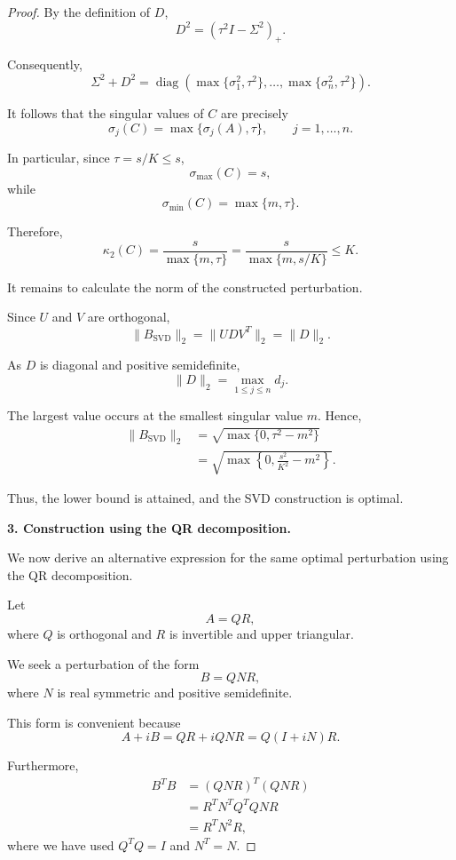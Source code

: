 \documentclass[11pt, reqno, a4paper]{amsart}
\theoremstyle{plain}
\theoremstyle{definition}
\theoremstyle{remark}
\numberwithin{equation}{section}
\begin{document}
\begin{proof}
By the definition of $D$,
\[
D^2=(\tau^2I-\Sigma^2)_+.
\]

Consequently,
\[
\Sigma^2+D^2
=
\operatorname{diag}
\left(
\max\{\sigma_1^2,\tau^2\},
\ldots,
\max\{\sigma_n^2,\tau^2\}
\right).
\]

It follows that the singular values of $C$ are precisely
\[
\boxed{
\sigma_j(C)=\max\{\sigma_j(A),\tau\},
\qquad j=1,\ldots,n.
}
\]

In particular, since $\tau=s/K\leq s$,
\[
\sigma_{\max}(C)=s,
\]
while
\[
\sigma_{\min}(C)=\max\{m,\tau\}.
\]

Therefore,
\[
\boxed{
\kappa_2(C)
=
\frac{s}{\max\{m,\tau\}}
=
\frac{s}{\max\{m,s/K\}}
\leq K.
}
\]

It remains to calculate the norm of the constructed
perturbation.

Since $U$ and $V$ are orthogonal,
\[
\|B_{\mathrm{SVD}}\|_2
=
\|UDV^T\|_2
=
\|D\|_2.
\]

As $D$ is diagonal and positive semidefinite,
\[
\|D\|_2
=
\max_{1\leq j\leq n}d_j.
\]

The largest value occurs at the smallest singular value
$m$. Hence,
\begin{align*}
\|B_{\mathrm{SVD}}\|_2
&=
\sqrt{\max\{0,\tau^2-m^2\}}\\
&=
\sqrt{
\max\left\{
0,\frac{s^2}{K^2}-m^2
\right\}
}.
\end{align*}

Thus, the lower bound is attained, and the SVD construction
is optimal.

\medskip

\noindent

\textbf{3. Construction using the QR decomposition.}

We now derive an alternative expression for the same
optimal perturbation using the QR decomposition.

Let
\[
A=QR,
\]
where $Q$ is orthogonal and $R$ is invertible and upper
triangular.

We seek a perturbation of the form
\[
B=QNR,
\]
where $N$ is real symmetric and positive semidefinite.

This form is convenient because
\[
A+iB
=
QR+iQNR
=
Q(I+iN)R.
\]

Furthermore,
\begin{align*}
B^TB
&=(QNR)^T(QNR)\\
&=R^TN^TQ^TQNR\\
&=R^TN^2R,
\end{align*}
where we have used $Q^TQ=I$ and $N^T=N$.


\end{proof}
\end{document}
